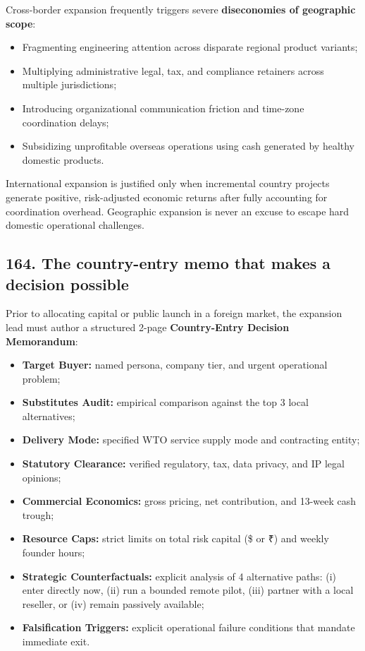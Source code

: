 Cross-border expansion frequently triggers severe \textbf{diseconomies of geographic scope}:
\begin{itemize}
    \item Fragmenting engineering attention across disparate regional product variants;
    \item Multiplying administrative legal, tax, and compliance retainers across multiple jurisdictions;
    \item Introducing organizational communication friction and time-zone coordination delays;
    \item Subsidizing unprofitable overseas operations using cash generated by healthy domestic products.
\end{itemize}
International expansion is justified only when incremental country projects generate positive, risk-adjusted economic returns after fully accounting for coordination overhead. Geographic expansion is never an excuse to escape hard domestic operational challenges.

\subsection{164. The country-entry memo that makes a decision possible}

Prior to allocating capital or public launch in a foreign market, the expansion lead must author a structured 2-page \textbf{Country-Entry Decision Memorandum}:
\begin{itemize}
    \item \textbf{Target Buyer:} named persona, company tier, and urgent operational problem;
    \item \textbf{Substitutes Audit:} empirical comparison against the top 3 local alternatives;
    \item \textbf{Delivery Mode:} specified WTO service supply mode and contracting entity;
    \item \textbf{Statutory Clearance:} verified regulatory, tax, data privacy, and IP legal opinions;
    \item \textbf{Commercial Economics:} gross pricing, net contribution, and 13-week cash trough;
    \item \textbf{Resource Caps:} strict limits on total risk capital (\$ or ₹) and weekly founder hours;
    \item \textbf{Strategic Counterfactuals:} explicit analysis of 4 alternative paths: (i) enter directly now, (ii) run a bounded remote pilot, (iii) partner with a local reseller, or (iv) remain passively available;
    \item \textbf{Falsification Triggers:} explicit operational failure conditions that mandate immediate exit.
\end{itemize}

